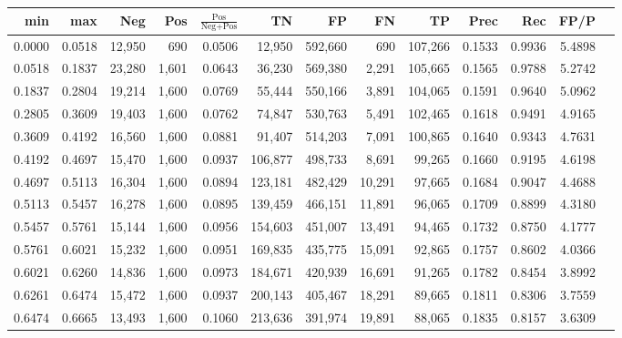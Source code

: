\begin{tabular}{rrrrrrrrrrrrr}
\toprule
   min &    max &    Neg &   Pos & $\frac{\text{Pos}}{\text{Neg}+\text{Pos}}$ &      TN &      FP &      FN &      TP &   Prec &    Rec &   FP/P \\
\midrule
0.0000 & 0.0518 & 12,950 &   690 &                                     0.0506 &  12,950 & 592,660 &     690 & 107,266 & 0.1533 & 0.9936 & 5.4898 \\
0.0518 & 0.1837 & 23,280 & 1,601 &                                     0.0643 &  36,230 & 569,380 &   2,291 & 105,665 & 0.1565 & 0.9788 & 5.2742 \\
0.1837 & 0.2804 & 19,214 & 1,600 &                                     0.0769 &  55,444 & 550,166 &   3,891 & 104,065 & 0.1591 & 0.9640 & 5.0962 \\
0.2805 & 0.3609 & 19,403 & 1,600 &                                     0.0762 &  74,847 & 530,763 &   5,491 & 102,465 & 0.1618 & 0.9491 & 4.9165 \\
0.3609 & 0.4192 & 16,560 & 1,600 &                                     0.0881 &  91,407 & 514,203 &   7,091 & 100,865 & 0.1640 & 0.9343 & 4.7631 \\
0.4192 & 0.4697 & 15,470 & 1,600 &                                     0.0937 & 106,877 & 498,733 &   8,691 &  99,265 & 0.1660 & 0.9195 & 4.6198 \\
0.4697 & 0.5113 & 16,304 & 1,600 &                                     0.0894 & 123,181 & 482,429 &  10,291 &  97,665 & 0.1684 & 0.9047 & 4.4688 \\
0.5113 & 0.5457 & 16,278 & 1,600 &                                     0.0895 & 139,459 & 466,151 &  11,891 &  96,065 & 0.1709 & 0.8899 & 4.3180 \\
0.5457 & 0.5761 & 15,144 & 1,600 &                                     0.0956 & 154,603 & 451,007 &  13,491 &  94,465 & 0.1732 & 0.8750 & 4.1777 \\
0.5761 & 0.6021 & 15,232 & 1,600 &                                     0.0951 & 169,835 & 435,775 &  15,091 &  92,865 & 0.1757 & 0.8602 & 4.0366 \\
0.6021 & 0.6260 & 14,836 & 1,600 &                                     0.0973 & 184,671 & 420,939 &  16,691 &  91,265 & 0.1782 & 0.8454 & 3.8992 \\
0.6261 & 0.6474 & 15,472 & 1,600 &                                     0.0937 & 200,143 & 405,467 &  18,291 &  89,665 & 0.1811 & 0.8306 & 3.7559 \\
0.6474 & 0.6665 & 13,493 & 1,600 &                                     0.1060 & 213,636 & 391,974 &  19,891 &  88,065 & 0.1835 & 0.8157 & 3.6309 \\

\end{tabular}
